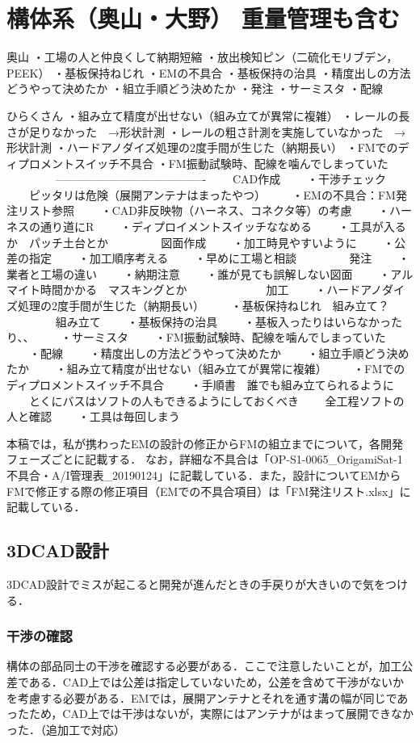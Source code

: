 \section{構体系（奥山・大野） 重量管理も含む}

奥山
・工場の人と仲良くして納期短縮
・放出検知ピン（二硫化モリブデン，PEEK）
・基板保持ねじれ
・EMの不具合
・基板保持の治具
・精度出しの方法どうやって決めたか
・組立手順どう決めたか
・発注
・サーミスタ
・配線

ひらくさん
・組み立て精度が出せない（組み立てが異常に複雑）
・レールの長さが足りなかった　→形状計測
・レールの粗さ計測を実施していなかった　→形状計測
・ハードアノダイズ処理の2度手間が生じた（納期長い）
・FMでのディプロメントスイッチ不具合
・FM振動試験時、配線を噛んでしまっていた
　　
　　----------------------------------------
　　CAD作成
　　・干渉チェック
　　ピッタリは危険（展開アンテナはまったやつ）
　　・EMの不具合：FM発注リスト参照
　　・CAD非反映物（ハーネス、コネクタ等）の考慮
　　・ハーネスの通り道にR
　　・ディプロイメントスイッチななめる
　　・工具が入るか　パッチ土台とか
　　
　　図面作成
　　・加工時見やすいように
　　・公差の指定
　　・加工順序考える
　　・早めに工場と相談
　　
　　発注
　　・業者と工場の違い
　　・納期注意
　　・誰が見ても誤解しない図面
　　・アルマイト時間かかる　マスキングとか
　　
　　
　　加工
　　・ハードアノダイズ処理の2度手間が生じた（納期長い）
　　・基板保持ねじれ　組み立て？
　　
　　組み立て
　　・基板保持の治具
　　・基板入ったりはいらなかったり、、
　　・サーミスタ
　　・FM振動試験時、配線を噛んでしまっていた
　　・配線
　　・精度出しの方法どうやって決めたか
　　・組立手順どう決めたか
　　・組み立て精度が出せない（組み立てが異常に複雑）
　　・FMでのディプロメントスイッチ不具合
　　・手順書　誰でも組み立てられるように
　　とくにバスはソフトの人もできるようにしておくべき
　　全工程ソフトの人と確認
　　・工具は毎回しまう
　　
\fi

本稿では，私が携わったEMの設計の修正からFMの組立までについて，各開発フェーズごとに記載する．
なお，詳細な不具合は「OP-S1-0065\_OrigamiSat-1不具合・A/I管理表\_20190124」に記載している．また，設計についてEMからFMで修正する際の修正項目（EMでの不具合項目）は「FM発注リスト.xlsx」に記載している．


\subsection{3DCAD設計}
3DCAD設計でミスが起こると開発が進んだときの手戻りが大きいので気をつける．
\subsubsection{干渉の確認}
構体の部品同士の干渉を確認する必要がある．ここで注意したいことが，加工公差である．CAD上では公差は指定していないため，公差を含めて干渉がないかを考慮する必要がある．EMでは，展開アンテナとそれを通す溝の幅が同じであったため，CAD上では干渉はないが，実際にはアンテナがはまって展開できなかった．（追加工で対応）
